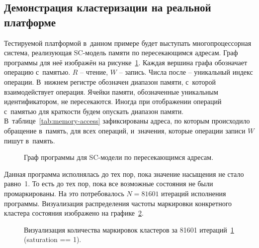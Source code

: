 \subsection{Демонстрация кластеризации на реальной платформе}
\label{sec:ch5/dist-demo-real}

Тестируемой платформой в~данном примере будет выступать
многопроцессорная система, реализующая SC-модель памяти по
пересекающимся адресам.
Граф программы для неё изображён на рисунке~\ref{fig:example-prog}.
Каждая вершина графа обозначает операцию с~памятью. $R$ -- чтение,
$W$ -- запись. Числа после -- уникальный индекс операции. В~нижнем
регистре обозначен диапазон памяти, с~которой взаимодействует
операция. Ячейки памяти, обозначенные уникальным идентификатором, не
пересекаются.
Иногда при отображении операций с~памятью для краткости будем
опускать диапазон памяти. В~таблице~\ref{tab:memory-access}
зафиксированы адреса, по которым происходило обращение в~память, для
всех операций, и~значения, которые операции записи $W$ пишут в~память.

\begin{figure}[ht]
  \centerfloat{
    
  }
  \caption{Граф программы для SC-модели по пересекающимся адресам.}
  \label{fig:example-prog}
\end{figure}

Данная программа исполнялась до тех пор, пока значение насыщения не
стало равно~1. То есть до тех пор, пока все возможные состояния не
были промаркированы.
На это потребовалось $N=81601$ итераций исполнения программы.
Визуализация распределения частоты маркировки конкретного кластера состояния
изображено на графике~\ref{fig:example-distibution}.

\begin{figure}[ht]
  \centerfloat{
    \resizebox{\textwidth}{!}{}
  }
  \caption{Визуализация количества маркировок кластеров за 81601
  итераций~\ref{fig:example-prog} (saturation == 1).}
  \label{fig:example-distibution}
\end{figure}

